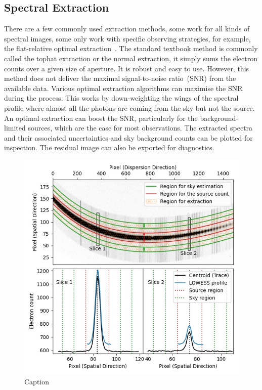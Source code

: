 \documentclass[fleqn,usenatbib]{mnras}
\begin{document}
\subsection{Spectral Extraction}
\label{sec:extract}
There are a few commonly used extraction methods, some work for
all kinds of spectral images, some only work with specific
observing strategies, for example, the flat-relative optimal
extraction~\citep{2014A&A...561A..59Z}. The standard textbook
method is commonly called the tophat extraction or the normal
extraction, it simply sums the electron counts over a given
size of aperture. It is robust and easy to use. However, this
method does not deliver the maximal signal-to-noise ratio~(SNR)
from the available data. Various optimal extraction algorithms
can maximise the SNR during the process. This works by
down-weighting the wings of the spectral profile where almost
all the photons are coming from the sky but not the source. An
optimal extraction can boost the SNR, particularly for the
background-limited sources, which are the case for most
observations. The extracted spectra and their associated
uncertainties and sky background counts can be plotted for
inspection. The residual image can also be exported for
diagnostics.

\begin{figure}
    \centering
    \includegraphics[width=\columnwidth]{fig_03_extraction_profile.jpg}
    \caption{Caption}
    \label{fig:extract}
\end{figure}
\end{document}
